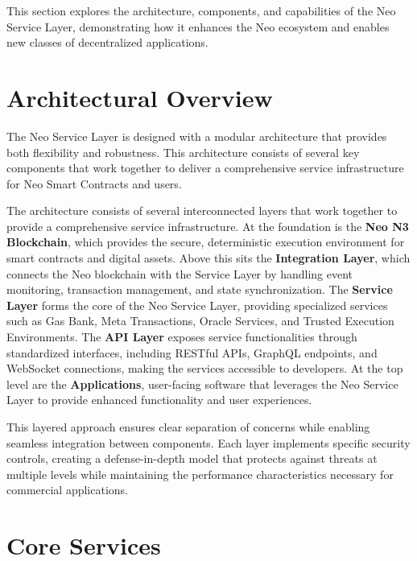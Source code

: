 \documentclass[11pt]{article}
\begin{document}
This section explores the architecture, components, and capabilities of the Neo Service Layer, demonstrating how it enhances the Neo ecosystem and enables new classes of decentralized applications.

\section{Architectural Overview}
\label{subsec:nsl-architecture}

The Neo Service Layer is designed with a modular architecture that provides both flexibility and robustness. This architecture consists of several key components that work together to deliver a comprehensive service infrastructure for Neo Smart Contracts and users.



The architecture consists of several interconnected layers that work together to provide a comprehensive service infrastructure. At the foundation is the \textbf{Neo N3 Blockchain}, which provides the secure, deterministic execution environment for smart contracts and digital assets. Above this sits the \textbf{Integration Layer}, which connects the Neo blockchain with the Service Layer by handling event monitoring, transaction management, and state synchronization. The \textbf{Service Layer} forms the core of the Neo Service Layer, providing specialized services such as Gas Bank, Meta Transactions, Oracle Services, and Trusted Execution Environments. The \textbf{API Layer} exposes service functionalities through standardized interfaces, including RESTful APIs, GraphQL endpoints, and WebSocket connections, making the services accessible to developers. At the top level are the \textbf{Applications}, user-facing software that leverages the Neo Service Layer to provide enhanced functionality and user experiences.

This layered approach ensures clear separation of concerns while enabling seamless integration between components. Each layer implements specific security controls, creating a defense-in-depth model that protects against threats at multiple levels while maintaining the performance characteristics necessary for commercial applications.

\section{Core Services}
\label{subsec:nsl-core-services}
\end{document}
